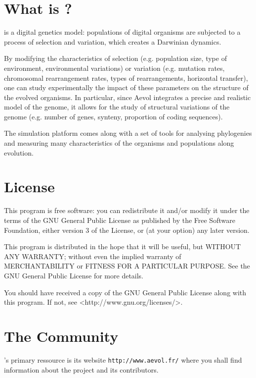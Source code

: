 \label{chap:intro}


\vspace{5mm}

\section{What is \aevol{}?}
\label{sec:whatis}
\aevol{} is a digital genetics model: populations of digital organisms are
subjected to a process of selection and variation, which creates a
Darwinian dynamics.

By modifying the characteristics of selection (e.g. population size,
type of environment, environmental variations) or variation (e.g.
mutation rates, chromosomal rearrangement rates, types of
rearrangements, horizontal transfer), one can study experimentally the
impact of these parameters on the structure of the evolved organisms.
In particular, since Aevol integrates a precise and realistic model of
the genome, it allows for the study of structural variations of the
genome (e.g. number of genes, synteny, proportion of coding sequences).

The simulation platform comes along with a set of tools for analysing
phylogenies and measuring many characteristics of the organisms and
populations along evolution.


\section{License}
\label{sec:license}
This program is free software: you can redistribute it and/or modify
it under the terms of the GNU General Public License as published by
the Free Software Foundation, either version 3 of the License, or
(at your option) any later version.

This program is distributed in the hope that it will be useful,
but WITHOUT ANY WARRANTY; without even the implied warranty of
MERCHANTABILITY or FITNESS FOR A PARTICULAR PURPOSE.  See the
GNU General Public License for more details.

You should have received a copy of the GNU General Public License
along with this program.  If not, see <http://www.gnu.org/licenses/>.


\section{The \aevol{} Community}
\label{sec:comm}
\aevol{}'s primary ressource is its website \verb?http://www.aevol.fr/? where you shall find information about the project and its contributors.

